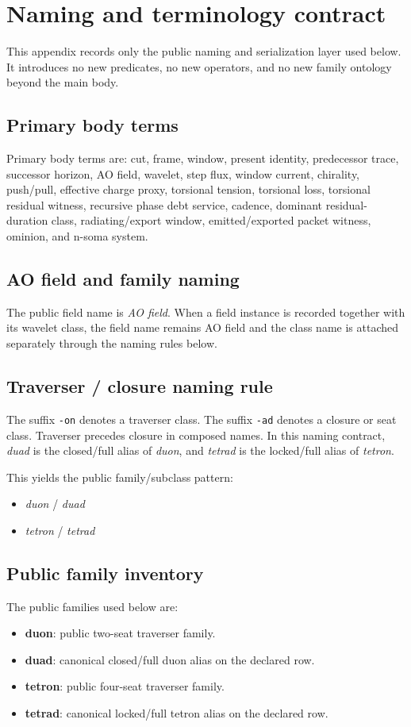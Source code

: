 \section{Naming and terminology contract}

This appendix records only the public naming and serialization layer used below. It introduces no new predicates, no new operators, and no new family ontology beyond the main body.

\subsection{Primary body terms}
Primary body terms are: cut, frame, window, present identity, predecessor trace, successor horizon, AO field, wavelet, step flux, window current, chirality, push/pull, effective charge proxy, torsional tension, torsional loss, torsional residual witness, recursive phase debt service, cadence, dominant residual-duration class, radiating/export window, emitted/exported packet witness, ominion, and n-soma system.

\subsection{AO field and family naming}
The public field name is \emph{AO field}. When a field instance is recorded together with its wavelet class, the field name remains AO field and the class name is attached separately through the naming rules below.

\subsection{Traverser / closure naming rule}
The suffix \texttt{-on} denotes a traverser class. The suffix \texttt{-ad} denotes a closure or seat class. Traverser precedes closure in composed names. In this naming contract, \emph{duad} is the closed/full alias of \emph{duon}, and \emph{tetrad} is the locked/full alias of \emph{tetron}.

This yields the public family/subclass pattern:
\begin{itemize}[leftmargin=1.5em]
  \item \emph{duon} / \emph{duad}
  \item \emph{tetron} / \emph{tetrad}
\end{itemize}

\subsection{Public family inventory}
The public families used below are:
\begin{itemize}[leftmargin=1.5em]
  \item \textbf{duon}: public two-seat traverser family.
  \item \textbf{duad}: canonical closed/full duon alias on the declared row.
  \item \textbf{tetron}: public four-seat traverser family.
  \item \textbf{tetrad}: canonical locked/full tetron alias on the declared row.
\end{itemize}

